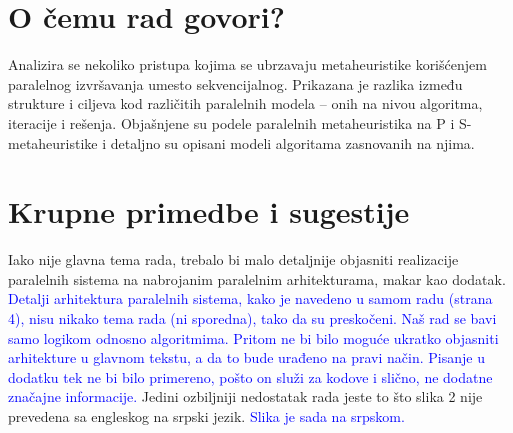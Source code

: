 \documentclass[a4paper]{report}
\newcommand{\odgovor}[1]{\textcolor{blue}{#1}}
\begin{document}
\section{O čemu rad govori?}
Analizira se nekoliko pristupa kojima se ubrzavaju metaheuristike korišćenjem paralelnog izvršavanja umesto sekvencijalnog. Prikazana je razlika između strukture i ciljeva kod različitih paralelnih modela – onih na nivou algoritma, iteracije i rešenja. Objašnjene su podele paralelnih metaheuristika na P i S-metaheuristike i detaljno su opisani modeli algoritama zasnovanih na njima.

\section{Krupne primedbe i sugestije}
Iako nije glavna tema rada, trebalo bi malo detaljnije objasniti realizacije paralelnih sistema na nabrojanim paralelnim arhitekturama, makar kao dodatak. \odgovor{Detalji arhitektura paralelnih sistema, kako je navedeno u samom radu (strana 4), nisu nikako tema rada (ni sporedna), tako da su preskočeni. Naš rad se bavi samo logikom odnosno algoritmima. Pritom ne bi bilo moguće ukratko objasniti arhitekture u glavnom tekstu, a da to bude urađeno na pravi način. Pisanje u dodatku tek ne bi bilo primereno, pošto on služi za kodove i slično, ne dodatne značajne informacije.} Jedini ozbiljniji nedostatak rada jeste to što slika 2 nije prevedena sa engleskog na srpski jezik. \odgovor{Slika je sada na srpskom.}
\end{document}
